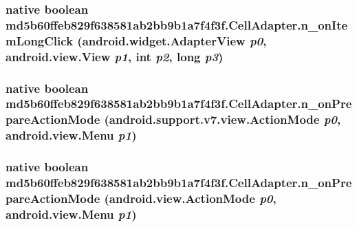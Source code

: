 \hypertarget{classmd5b60ffeb829f638581ab2bb9b1a7f4f3f_1_1_cell_adapter_5301628c9f5025605e0c12a308a87705}{
\subsubsection[{n\_\-onItemLongClick}]{\setlength{\rightskip}{0pt plus 5cm}native boolean md5b60ffeb829f638581ab2bb9b1a7f4f3f.CellAdapter.n\_\-onItemLongClick (android.widget.AdapterView {\em p0}, \/  android.view.View {\em p1}, \/  int {\em p2}, \/  long {\em p3})}}
\label{classmd5b60ffeb829f638581ab2bb9b1a7f4f3f_1_1_cell_adapter_5301628c9f5025605e0c12a308a87705}


\hypertarget{classmd5b60ffeb829f638581ab2bb9b1a7f4f3f_1_1_cell_adapter_8a9bdd2e1b8da9b7efff9f1252e170d3}{
\subsubsection[{n\_\-onPrepareActionMode}]{\setlength{\rightskip}{0pt plus 5cm}native boolean md5b60ffeb829f638581ab2bb9b1a7f4f3f.CellAdapter.n\_\-onPrepareActionMode (android.support.v7.view.ActionMode {\em p0}, \/  android.view.Menu {\em p1})}}
\label{classmd5b60ffeb829f638581ab2bb9b1a7f4f3f_1_1_cell_adapter_8a9bdd2e1b8da9b7efff9f1252e170d3}


\hypertarget{classmd5b60ffeb829f638581ab2bb9b1a7f4f3f_1_1_cell_adapter_2b208b6906f76ea8618d4a8fdfd42930}{
\subsubsection[{n\_\-onPrepareActionMode}]{\setlength{\rightskip}{0pt plus 5cm}native boolean md5b60ffeb829f638581ab2bb9b1a7f4f3f.CellAdapter.n\_\-onPrepareActionMode (android.view.ActionMode {\em p0}, \/  android.view.Menu {\em p1})}}
\label{classmd5b60ffeb829f638581ab2bb9b1a7f4f3f_1_1_cell_adapter_2b208b6906f76ea8618d4a8fdfd42930}


